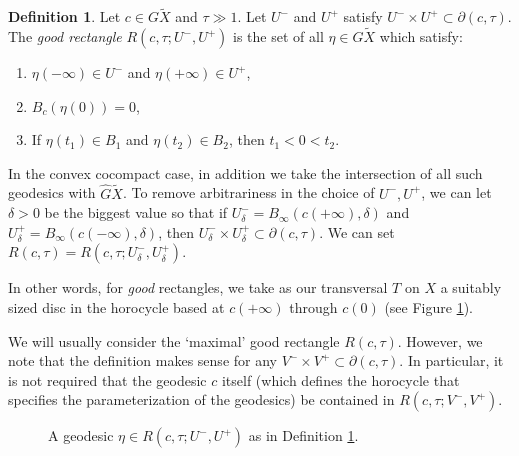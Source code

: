 \documentclass[10pt]{amsart}
\theoremstyle{definition}
\newtheorem{defn}[thm]{Definition}
\numberwithin{equation}{section}
\begin{document}
\begin{defn}\label{def:good rectangle}
Let $c\in G\tilde X$ and $\tau \gg 1$. Let $U^-$ and $U^+$ satisfy $U^- \times U^+ \subset \partial (c, \tau)$. The \emph{good rectangle} $R(c, \tau; U^-, U^+)$ is the set of all $\eta \in G \tilde X$ which satisfy:
\begin{enumerate}
\item $\eta(-\infty) \in U^-$ and $\eta(+\infty) \in U^+$,
\item $B_{c}(\eta(0)) = 0$,
\item If $\eta(t_1)\in B_1$ and $\eta(t_2)\in B_2$, then $t_1<0<t_2$.
\end{enumerate}
In the convex cocompact case, in addition we take the intersection of all such geodesics with $\hat G\tilde X$. To remove arbitrariness in the choice of $U^-, U^+$, we can let $\delta>0$ be the biggest value so that if $U^-_\delta = B_\infty(c(+\infty), \delta)$ and $U^+_\delta = B_\infty(c(-\infty), \delta)$, then $U^-_\delta \times U^+_\delta \subset \partial(c, \tau)$. We can set $R(c, \tau)= R(c, \tau; U^-_\delta, U^+_\delta)$.
\end{defn}

In other words, for \emph{good} rectangles, we take as our transversal $T$ on $X$ a suitably sized disc in the horocycle based at $c(+\infty)$ through $c(0)$ (see Figure \ref{fig:good rectangle}).

We will usually consider the `maximal' good rectangle $R(c, \tau)$. However, we note that the definition makes sense for any $V^- \times V^+ \subset \partial (c, \tau)$. In particular, it is not required that the geodesic $c$ itself (which defines the horocycle that specifies the parameterization of the geodesics) be contained in $R(c, \tau; V^-, V^+)$.

\begin{figure}[htb]
\caption{A geodesic $\eta\in R(c, \tau ; U^-,U^+)$ as in Definition \ref{def:good rectangle}.}\label{fig:good rectangle}
\end{figure}
\end{document}
